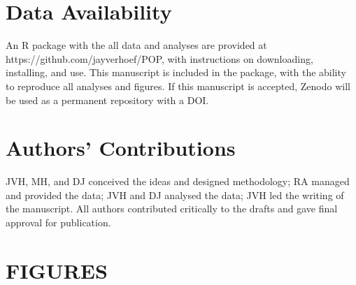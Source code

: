 \documentclass[11pt, titlepage]{article}
\begin{document}
\begin{spacing}{1.9}
\begin{flushleft}
\section*{Data Availability}

An R package with the all data and analyses are provided at https://github.com/jayverhoef/POP, with instructions on downloading, installing, and use.  This manuscript is included in the package, with the ability to reproduce all analyses and figures. If this manuscript is accepted, Zenodo will be used as a permanent repository with a DOI.

\section*{Authors' Contributions}

JVH, MH, and DJ conceived the ideas and designed methodology; RA managed and provided the data; JVH and DJ analysed the data; JVH led the writing of the manuscript. All authors contributed critically to the drafts and gave final approval for publication.


%


%
%


\newpage
{}

\section*{FIGURES}



\end{flushleft}
\end{spacing}
\end{document}
